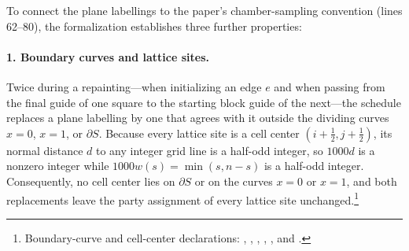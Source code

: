 \documentclass{article}
\begin{document}
To connect the plane labellings to the paper's chamber-sampling convention
(lines 62--80), the formalization establishes three further properties:

\paragraph{1. Boundary curves and lattice sites.}
Twice during a repainting---when initializing an edge $e$ and when passing from
the final guide of one square to the starting block guide of the next---the
schedule replaces a plane labelling by one that agrees with it outside the
dividing curves $x=0$, $x=1$, or $\partial S$. Because every lattice site is a
cell center $(i+\tfrac12,j+\tfrac12)$, its normal distance $d$ to any integer
grid line is a half-odd integer, so $1000d$ is a nonzero integer while
$1000w(s)=\min(s,n-s)$ is a half-odd integer. Consequently, no cell center lies
on $\partial S$ or on the curves $x=0$ or $x=1$, and both replacements leave
the party assignment of every lattice site unchanged.\footnote{Boundary-curve
and cell-center declarations:
,
,
,
,
, and
.}
\end{document}
